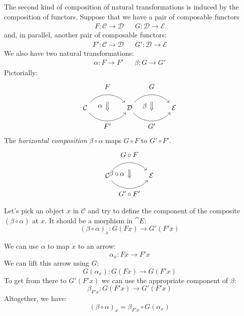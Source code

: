 \documentclass[DaoFP]{subfiles}
\begin{document}
The second kind of composition of natural transformations is induced by the composition of functors. Suppose that we have a pair of composable functors
\begin{align*}
 F \colon \mathcal{C} \to \mathcal{D}
&&G \colon \mathcal{D} \to \mathcal{E} 
\end{align*}
and, in parallel, another pair of composable functors:
\begin{align*}
 F' \colon \mathcal{C} \to \mathcal{D}
&& G' \colon \mathcal{D} \to \mathcal{E} 
\end{align*}
We also have two natural transformations:
\begin{align*}
\alpha \colon F \to F'  
&& \beta \colon G \to G' 
\end{align*}
Pictorially:
\[
\begin{tikzcd}[column sep=huge]
\mathcal{C}
  \arrow[bend left=50]{r}[name=U, label=above:$F$]{}
  \arrow[bend right=50]{r}[name=D, label=below:$F'$]{} 
 &
\mathcal{D}
  \arrow[bend left=50]{r}[name=U1, label=above:$G$]{}
  \arrow[bend right=50]{r}[name=D1, label=below:$G'$]{} 
 &
\mathcal{E}
  \arrow[shorten <=10pt,shorten >=10pt,Rightarrow,to path={(U) -- node[label=left:$\alpha$] {} (D)}]{}
  \arrow[shorten <=10pt,shorten >=10pt,Rightarrow,to path={(U1) -- node[label=left:$\beta$] {} (D1)}]{}
\end{tikzcd}
\]
The \emph{horizontal composition} $\beta \circ \alpha$ maps $G \circ F$ to $G' \circ F'$.
\[
\begin{tikzcd}[column sep=huge]
\mathcal{C}
  \arrow[bend left=50]{r}[name=U, label=above:$G \circ F$]{}
  \arrow[bend right=50]{r}[name=D, label=below:$G' \circ F'$]{} 
 &
\mathcal{E}
  \arrow[shorten <=10pt,shorten >=10pt,Rightarrow,to path={(U) -- node[label=left:$\beta \circ \alpha$] {} (D)}]{}
\end{tikzcd}
\]


Let's pick an object $x$ in $\mathcal{C}$ and try to define the component of the composite $(\beta \circ \alpha)$ at $x$. It should be a morphism in $\cat E$:
\[ (\beta \circ \alpha)_x \colon G ( F x) \to G' ( F' x) \]

We can use $\alpha$ to map $x$ to an arrow:
\[ \alpha_x \colon F x \to F' x \]
We can lift this arrow using $G$:
\[ G (\alpha_x) \colon G (F x) \to G (F' x) \]
To get from there to $G' (F' x)$ we can use the appropriate component of $\beta$:
\[ \beta_{F' x} \colon G (F' x) \to G' (F' x) \]
Altogether, we have:
\[ (\beta \circ \alpha)_x = \beta_{F' x} \circ G (\alpha_x) \]
\end{document}
